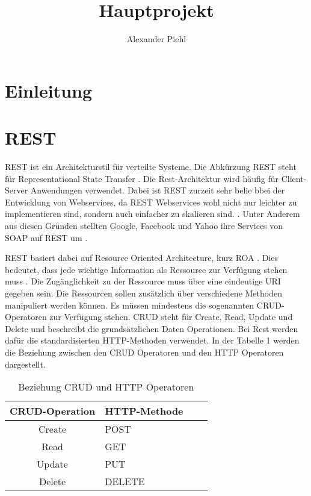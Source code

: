 \documentclass{llncs}
\title{Hauptprojekt}
\author{Alexander Piehl\\\email{alexander.piehl@haw-hamburg.de}
\institute{Hamburg University of Applied Sciences,\\Dept. Computer Science, \\ Berliner Tor 7\\ 20099 Hamburg, Germany\\}}
\begin{document}
\maketitle
\section{Einleitung}
\nocite{*}
\section{REST}
REST ist ein Architekturstil für verteilte Systeme. Die Abkürzung REST  steht für Representational State Transfer \cite{chakrabarti2009test}.
Die Rest-Architektur wird häufig für Client-Server Anwendungen verwendet. 
Dabei ist REST zurzeit sehr belie bbei der  Entwicklung von Webservices, da REST Webservices wohl nicht nur leichter zu implementieren sind, sondern auch einfacher zu skalieren sind. \cite{chakrabarti2009test}. 
Unter Anderem aus diesen Gründen stellten Google, Facebook und Yahoo ihre Services von SOAP auf REST um \cite{rodriguez2008restful, navas2014rest}.

REST basiert dabei auf Resource Oriented Architecture, kurz ROA \citep{chakrabarti2009test}. Dies bedeutet, dass jede wichtige Information als Ressource zur Verfügung stehen muss \cite{porres2011modeling}.
Die Zugänglichkeit zu der Ressource muss über eine eindeutige URI gegeben sein. Die Ressourcen sollen zusätzlich über verschiedene Methoden manipuliert werden können. Es müssen mindestens die sogenannten CRUD-Operatoren zur Verfügung stehen. CRUD steht für Create, Read, Update und Delete und beschreibt die grundsätzlichen Daten Operationen. Bei Rest werden dafür die standardisierten HTTP-Methoden verwendet. In der Tabelle 1 werden die Beziehung zwischen den CRUD Operatoren und den HTTP Operatoren dargestellt.

\begin{table}[]
\centering
\label{CRUD_HTTP_Methods}
\begin{tabular}{|c|l|p{4cm}|p{4cm}|}
\hline
\multicolumn{1}{|l|}{CRUD-Operation} & HTTP-Methode \\ \hline
Create & POST  \\ \hline
Read & GET \\ \hline
Update & PUT \\ \hline
Delete & DELETE \\ \hline
\end{tabular}
\caption{Beziehung CRUD und HTTP Operatoren \cite{reza2010framework}}
\end{table}
\end{document}
